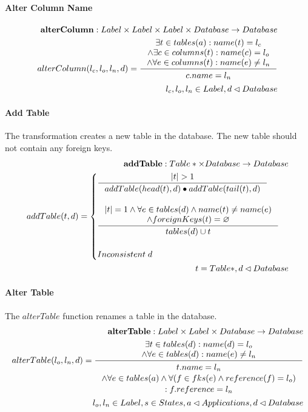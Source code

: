 \documentclass[11pt]{article}
\begin{document}
\paragraph{Alter Column Name}
\begin{align*}
\mathbf{alterColumn} : Label \times Label \times Label \times Database \rightarrow Database \\
	alterColumn(l_c, l_o, l_n, d) =
 \inference{\exists t \in tables(a) : name(t) = l_c \\ \wedge \exists c \in columns(t) : name(c) = l_o \\ \wedge \forall e \in columns(t) : name(e) \neq l_n}{\begin{gathered}
c.name = l_n 
\end{gathered}}
 \\
l_c, l_o, l_n \in Label, d \lhd Database
\end{align*}

\paragraph{Add Table} The transformation creates a new table in the database. The new table should not contain any foreign keys.
\begin{align*}
	\mathbf{addTable} : Table* \times Database \rightarrow Database \\ 
	addTable(t, d) = \begin{cases}
		\inference{|t| > 1}{addTable(head(t),d) \bullet addTable(tail(t), d)}
\\ \\	
		\inference{|t| = 1 \wedge \forall e \in tables(d) \wedge name(t) \neq name(e) \\ \wedge foreignKeys(t) = \varnothing }{tables(d) \cup t}
\\ \\
		Inconsistent \;d 
	 \end{cases}\\ 
	t = Table*, d \lhd Database
\end{align*}

\paragraph{Alter Table} The $alterTable$ function renames a table in  the database.
\begin{align*}
	\mathbf{alterTable} : Label \times Label \times Database \rightarrow Database \\
	alterTable(l_o, l_n, d) = \inference{\exists t \in tables(d) : name(d) = l_o \\ \wedge \forall e \in tables(d) : name(e) \neq l_n}{\begin{gathered}
		t.name = l_n \\ \wedge \forall e \in tables(a) \wedge \forall (f \in fks(e) \wedge reference(f) = l_o ) \\ : f.reference = l_n 
	\end{gathered}}\\
	l_o, l_n \in Label, s \in States, a \lhd Applications, d \lhd Database
\end{align*}
\end{document}

